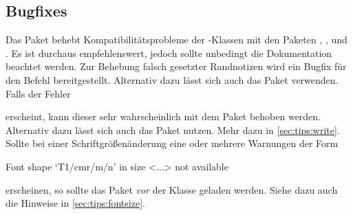 \subsection{Bugfixes}
%
\begin{DeclarePackages}
  Das Paket behebt Kompatibilitätsprobleme der \KOMAScript-Klassen mit den 
  Paketen , ,  und
  . Es ist durchaus empfehlenswert, jedoch sollte unbedingt 
  die Dokumentation beachtet werden.
  Zur Behebung falsch gesetzter Randnotizen wird ein Bugfix für den Befehl 
   bereitgestellt. Alternativ dazu lässt sich auch das Paket 
   verwenden.
  Falls der Fehler
\begin{quoting}[rightmargin=0pt]
\end{quoting}
  erscheint, kann dieser sehr wahrscheinlich mit dem Paket  
  behoben werden. Alternativ dazu lässt sich auch das Paket 
   nutzen. Mehr dazu in \autoref{sec:tips:write}.
  Sollte bei einer Schriftgrößenänderung eine oder mehrere Warnungen der Form
\begin{quoting}[rightmargin=0pt]
\begin{Code}
Font shape `T1/cmr/m/n' in size <...> not available
\end{Code}
\end{quoting}
  erscheinen, so sollte das Paket  \emph{vor} der Klasse 
  geladen werden. Siehe dazu auch die Hinweise in \autoref{sec:tips:fontsize}.
\end{DeclarePackages}
%
